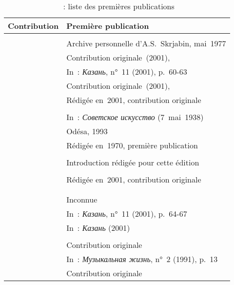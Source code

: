 \begin{table}[!htbp]
 \fontsize{10}{13.3pt}\selectfont
 \centering
 \caption{\citet{Scriabine}~: liste des premières publications}
 \label{tab:Scriabine}
 \begin{tabular}{ll}
  \toprule
  \textbf{Contribution} & \textbf{Première publication} \\
  \midrule
  \citet{Vedernikov13} & \citet{Vedernikov01} \\
  \citet{Smirnov13} & Archive personnelle d'A.S.~Skrjabin, mai~1977 \\
  \citet{Orlovsky13} & Contribution originale~(2001), \citet{Orlovsky12} \\
  \citet{Spiridonova13} & In~: \emph{Казань}, n°~11 (2001), p.~60-63 \\
  \citet{Sokolov13} & Contribution originale~(2001), \citet{Sokolov01} \\
  \citet{Kuznetsov13} & Rédigée en~2001, contribution originale \\
  \citet{Yudina13} & \citet[p.~127-134]{Milshteyn70} \\
  \citet{Nikolaiev13} & In~: \emph{Советское искусство} (7~mai~1938) \\
  \citet{Alekseiev13a} & Odésa, 1993 \\
  \citet{Zinger13} & Rédigée en~1970, première publication \\
  \citet{Merkoulov13} & \citet[p.~302-318]{Smirnov88} \\
  \citet{Scriabine13a} & Introduction rédigée pour cette édition \\
  \citet{Zhukova13} & \citet[p.~187-214]{Sokolov68} \\
  \citet{Salnikov13} & Rédigée en~2001, contribution originale \\
  \citet{Eshpai13} & \citet{Eshpai00} \\
  \citet{Sofronitsky13a} & \citet[p.~55-86]{Milshteyn70} \\
  \citet{Sofronitsky13b} & Inconnue \\
  \citet{Sofronitskaya13} & In~: \emph{Казань}, n°~11 (2001), p.~64-67 \\
  \citet{Kogan13} & In~: \emph{Казань} (2001) \\
  \citet{Berkovskaya13} & \citet{Berkovskaya08} \\
  \citet{Askoldova13} & Contribution originale \\
  \citet{Barinova13} & In~: \emph{Музыкальная жизнь}, n°~2 (1991), p.~13 \\
  \citet{Pasternak13} & Contribution originale \\

\end{tabular}
\end{table}
